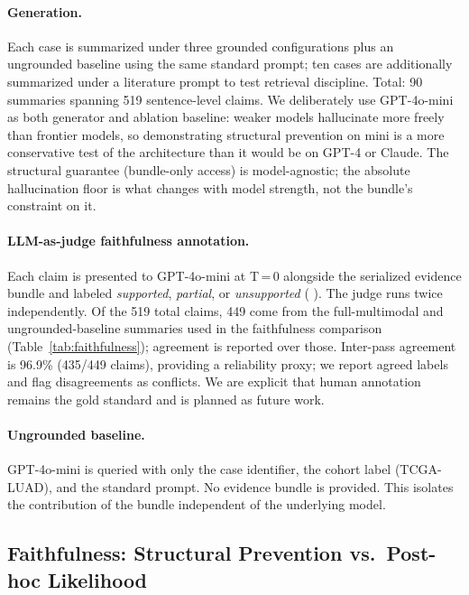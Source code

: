 \documentclass[11pt]{article}
\begin{document}
\paragraph{Generation.}
Each case is summarized under three grounded configurations plus an ungrounded baseline using the same standard prompt; ten cases are additionally summarized under a literature prompt to test retrieval discipline. Total: 90 summaries spanning 519 sentence-level claims. We deliberately use GPT-4o-mini as both generator and ablation baseline: weaker models hallucinate more freely than frontier models, so demonstrating structural prevention on mini is a more conservative test of the architecture than it would be on GPT-4 or Claude. The structural guarantee (bundle-only access) is model-agnostic; the absolute hallucination floor is what changes with model strength, not the bundle's constraint on it.

\paragraph{LLM-as-judge faithfulness annotation.}
Each claim is presented to GPT-4o-mini at T\,=\,0 alongside the serialized evidence bundle and labeled \emph{supported}, \emph{partial}, or \emph{unsupported} (\citeauthor{zheng2023judging} \citeyear{zheng2023judging}). The judge runs twice independently. Of the 519 total claims, 449 come from the full-multimodal and ungrounded-baseline summaries used in the faithfulness comparison (Table~\ref{tab:faithfulness}); agreement is reported over those. Inter-pass agreement is 96.9\% (435/449 claims), providing a reliability proxy; we report agreed labels and flag disagreements as conflicts. We are explicit that human annotation remains the gold standard and is planned as future work.

\paragraph{Ungrounded baseline.}
GPT-4o-mini is queried with only the case identifier, the cohort label (TCGA-LUAD), and the standard prompt. No evidence bundle is provided. This isolates the contribution of the bundle independent of the underlying model.

\subsection{Faithfulness: Structural Prevention vs.\ Post-hoc Likelihood}
\end{document}
